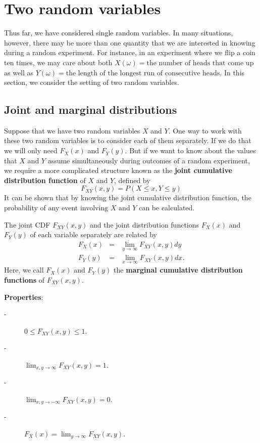 \documentclass{article}
\begin{document}
\section{Two random variables}

Thus far, we have considered single random variables.  In many
situations, however, there may be more than one quantity that we are
interested in knowing during a random experiment.  For instance, in an
experiment where we flip a coin ten times, we may care about both $X(\omega) =
\text{the number of heads that come up}$ as well as $Y(\omega) = \text{the
length of the longest run of consecutive heads}$.  In this section, we
consider the setting of two random variables.

\subsection{Joint and marginal distributions}

Suppose that we have two random variables $X$ and $Y$. One way to work
with these two random variables is to consider each of them
separately. If we do that we will only need $F_X(x)$ and $F_Y(y)$.
But if we want to know about the values that $X$ and $Y$ assume
simultaneously during outcomes of a random experiment, we require
a more complicated structure known as the 
\textbf{joint cumulative distribution function} of $X$ and $Y$, defined by
\begin{equation*}
F_{XY}(x,y)=P(X \leq x, Y \leq y)
\end{equation*}
It can be shown that by knowing the joint
cumulative distribution function,
the probability of any event involving $X$ and $Y$ can be calculated. 

The joint CDF $F_{XY}(x,y)$ and the joint distribution functions
$F_X(x)$ and $F_Y(y)$ of each variable separately are related by
\begin{eqnarray*}
  F_X(x) &=& \lim_{y \rightarrow \infty} F_{XY}(x,y) dy \\
  F_Y(y) &=& \lim_{x \rightarrow \infty} F_{XY}(x,y) dx.
\end{eqnarray*}
Here, we call $F_X(x)$ and $F_Y(y)$ the \textbf{marginal cumulative distribution functions}
of $F_{XY}(x,y)$.

\textbf{Properties}:
\begin{description}
\item[-] $0 \leq F_{XY}(x,y) \leq 1$.
\item[-] $\lim_{x,y \rightarrow \infty} F_{XY}(x,y)=1$.
\item[-] $\lim_{x,y \rightarrow -\infty} F_{XY}(x,y)=0$.
\item[-] $ F_X(x)= \lim_{y \rightarrow \infty} F_{XY}(x,y)$.
\end{description}
\end{document}
